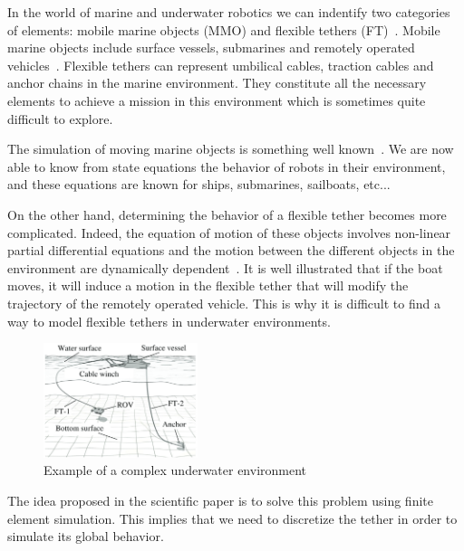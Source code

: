 In the world of marine and underwater robotics we can indentify two categories of elements: mobile marine objects (MMO) and flexible tethers (FT)~\cite{blintsov_development_2017}. Mobile marine objects include surface vessels, submarines and remotely operated vehicles~\cite{jaulin_mobile_2019}. Flexible tethers can represent umbilical cables, traction cables and anchor chains in the marine environment. They constitute all the necessary elements to achieve a mission in this environment which is sometimes quite difficult to explore.

The simulation of moving marine objects is something well known~\cite{ganoni_generalized_2018}. We are now able to know from state equations the behavior of robots in their environment, and these equations are known for ships, submarines, sailboats, etc...~\cite{jaulin_mobile_2019}

On the other hand, determining the behavior of a flexible tether becomes more complicated. Indeed, the equation of motion of these objects involves non-linear partial differential equations and the motion between the different objects in the environment are dynamically dependent~\cite{blintsov_development_2017}. It is well illustrated that if the boat moves, it will induce a motion in the flexible tether that will modify the trajectory of the remotely operated vehicle. This is why it is difficult to find a way to model flexible tethers in underwater environments.

\begin{figure}[!htb]
	\centering
	\includegraphics[width=0.4\textwidth]{imgs/underwater_environment.png}
	\caption{Example of a complex underwater environment }
	\label{fig:underwater_environment}
\end{figure}

The idea proposed in the scientific paper is to solve this problem using finite element simulation. This implies that we need to discretize the tether in order to simulate its global behavior.